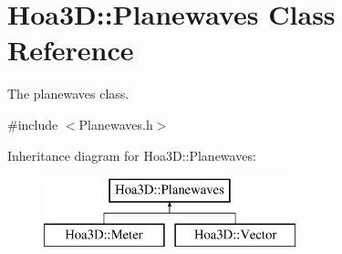 \hypertarget{class_hoa3_d_1_1_planewaves}{\section{Hoa3\-D\-:\-:Planewaves Class Reference}
\label{class_hoa3_d_1_1_planewaves}
}


The planewaves class.  




{\ttfamily \#include $<$Planewaves.\-h$>$}

Inheritance diagram for Hoa3\-D\-:\-:Planewaves\-:\begin{figure}[H]
\begin{center}
\leavevmode
\includegraphics[height=2.000000cm]{class_hoa3_d_1_1_planewaves}
\end{center}
\end{figure}
